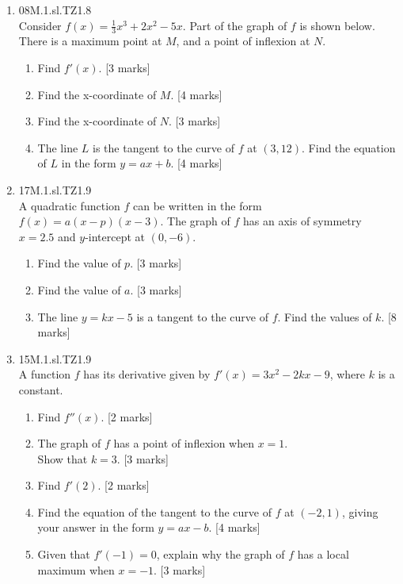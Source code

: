 \documentclass[12pt, twoside]{article}
\begin{document}
\begin{enumerate}
    \item 08M.1.sl.TZ1.8\\
    Consider $f(x)= \frac{1}{3} x^3+2x^2-5x$. Part of the graph of $f$ is shown below. There is a maximum point at $M$, and a point of inflexion at $N$.
      \begin{center}
      \end{center}
      \begin{enumerate}
        \item Find $f'(x)$. [3 marks]
        \item Find the x-coordinate of $M$. [4 marks]
        \item Find the x-coordinate of $N$. [3 marks]
        \item The line $L$ is the tangent to the curve of $f$ at $(3,12)$. Find the equation of $L$ in the form $y=ax+b$. [4 marks]
      \end{enumerate}

    \item 17M.1.sl.TZ1.9\\
    A quadratic function $f$ can be written in the form  $f(x)=a(x-p)(x-3)$. The graph of $f$ has an axis of symmetry $x=2.5$ and $y$-intercept at $(0,-6)$.
    \begin{enumerate}
      \item Find the value of $p$. [3 marks]
      \item Find the value of $a$. [3 marks]
      \item The line $y=kx-5$ is a tangent to the curve of $f$. Find the values of $k$. [8 marks]
    \end{enumerate}

    \item 15M.1.sl.TZ1.9\\
    A function $f$ has its derivative given by $f'(x)=3x^2-2kx-9$, where $k$ is a constant.
    \begin{enumerate}
      \item Find $f''(x)$. [2 marks]
      \item The graph of $f$ has a point of inflexion when $x=1$.\\
      Show that $k=3$. [3 marks]
      \item Find $f'(2)$. [2 marks]
      \item Find the equation of the tangent to the curve of $f$ at $(-2,1)$, giving your answer in the form  $y=ax-b$. [4 marks]
      \item Given that $f'(-1)=0$, explain why the graph of $f$ has a local maximum when $x=-1$. [3 marks]
    \end{enumerate}


\end{enumerate}
\end{document}

